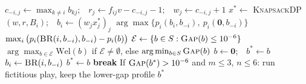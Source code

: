 \documentclass{article}
\theoremstyle{definition}
\begin{document}
\begin{algorithm}[t]
\caption{Tier-1 reference profile $b^\ast$ (known $f$)}\label{alg:tier1}
\small
\begin{algorithmic}[1]
  \State $c_{-i,j}\gets\max_{k\ne i}b_{kj}$;\ \ $r_j\gets f_{ij}v-c_{-i,j}-1$;\ \ $w_j\gets c_{-i,j}+1$
  \State $x^\ast\gets$ \textsc{KnapsackDP}$(w,r,B_i)$;\ \ $b_i\gets(w_jx^\ast_j)_j$
  \State \Return $\arg\max\{p_i(b_i,b_{-i}),\ p_i(\mathbf 0,b_{-i})\}$
\EndFunction
{}\ \Return $\max_i\big(p_i(\textsc{BR}(i,b_{-i}),b_{-i})-p_i(b)\big)$\EndFunction
{}
  \State $\mathcal E\gets\{b\in S:\textsc{Gap}(b)\le10^{-6}\}$ 
  \State \Return $\arg\max_{b\in\mathcal E}\mathrm{Wel}(b)$ if $\mathcal E\neq\emptyset$, else $\arg\min_{b\in S}\textsc{Gap}(b)$
\EndIf
\State $b\gets\mathbf 0$;\ \ $b^\ast\gets b$
   $b_i\gets\textsc{BR}(i,b_{-i})$\EndFor
   $b^\ast\gets b$\EndIf
   \textbf{break}\EndIf
\EndFor
\State If $\textsc{Gap}(b^\ast)>10^{-6}$ and $m\le3$, $n\le6$: run fictitious play, keep the lower-gap profile
\State \Return $b^\ast$
\end{algorithmic}
\end{algorithm}
\end{document}
